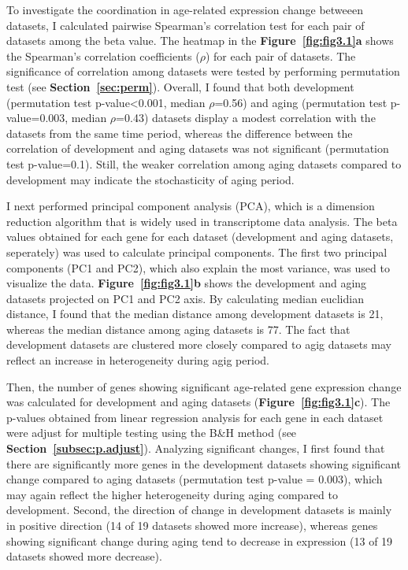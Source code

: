 To investigate the coordination in age-related expression change betweeen datasets, 
I calculated pairwise Spearman's correlation test for each pair of datasets among the beta value.
The heatmap in the \textbf{Figure~\ref{fig:fig3.1}a} shows the Spearman's correlation coefficients ($\rho$) for each pair of datasets.
The significance of correlation among datasets were tested by performing permutation test (see \textbf{Section~\ref{sec:perm}}).
Overall, I found that both development (permutation test p-value<0.001, median $\rho$=0.56) and aging (permutation test p-value=0.003, median $\rho$=0.43)
datasets display a modest correlation with the datasets from the same time period, 
whereas the difference between the correlation of development and aging datasets was not significant (permutation test p-value=0.1).
Still, the weaker correlation among aging datasets compared to development may indicate the stochasticity of aging period.

I next performed principal component analysis (PCA), which is a dimension reduction algorithm that is widely used in transcriptome data analysis. 
The beta values obtained for each gene for each dataset (development and aging datasets, seperately) was used to calculate principal components.
The first two principal components (PC1 and PC2), which also explain the most variance, was used to visualize the data.
\textbf{Figure~\ref{fig:fig3.1}b} shows the development and aging datasets projected on PC1 and PC2 axis.
By calculating median euclidian distance, I found that the median distance among development datasets is 21, 
whereas the median distance among aging datasets is 77. 
The fact that development datasets are clustered more closely compared to agig datasets may reflect an increase in heterogeneity during agig period.

Then, the number of genes showing significant age-related gene expression change was calculated for development and aging datasets (\textbf{Figure~\ref{fig:fig3.1}c}).
The p-values obtained from linear regression analysis for each gene in each dataset were adjust for multiple testing using the B{\&}H method (see \textbf{Section~\ref{subsec:p.adjust}}).
Analyzing significant changes, I first found that there are significantly more genes in the development datasets showing significant change compared to aging datasets (permutation test p-value = 0.003),
which may again reflect the higher heterogeneity during aging compared to development.
Second, the direction of change in development datasets is mainly in positive direction (14 of 19 datasets showed more increase), 
whereas genes showing significant change during aging tend to decrease in expression (13 of 19 datasets showed more decrease).

